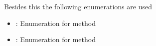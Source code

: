 \documentclass[letterpaper,10pt,english]{sphinxmanual}
\begin{document}
\sphinxAtStartPar
Besides this the following enumerations are used
\begin{itemize}
\item {} 
\sphinxAtStartPar
{\hyperref[\detokenize{eezz:eezz.table.TNavigation}]{}}:   Enumeration for method {\hyperref[\detokenize{eezz:eezz.table.TTable.navigate}]{}}

\item {} 
\sphinxAtStartPar
{\hyperref[\detokenize{eezz:eezz.table.TSort}]{}}:         Enumeration for method {\hyperref[\detokenize{eezz:eezz.table.TTable.do_sort}]{}}

\end{itemize}
\end{document}

